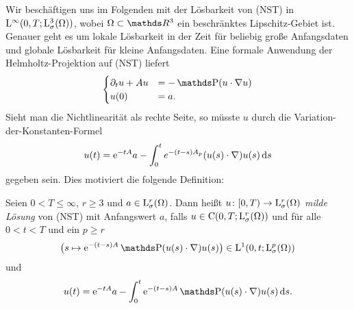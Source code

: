 Wir beschäftigen uns im Folgenden mit der Lösbarkeit von (NST) in $\mathrm{L}^\infty(0,T; \mathrm{L}^3_\sigma(\Omega))$, wobei $\Omega \subset \R^3$ ein beschränktes Lipschitz-Gebiet ist.
Genauer geht es um lokale Lösbarkeit in der Zeit für beliebig große Anfangsdaten und globale Lösbarkeit für kleine Anfangsdaten. Eine formale Anwendung der Helmholtz-Projektion auf (NST) liefert
$$
\begin{cases}
  \partial_t u + Au & = - \PP(u\cdot \nabla u) \\
  u(0) &= a.
\end{cases}
$$
Sieht man die Nichtlinearität als rechte Seite, so müsste $u$ durch die Variation-der-Konstanten-Formel
$$
u(t) = \mathrm{e}^{-tA} a - \int_0^t e^{-(t - s)A_p}(u(s) \cdot \nabla) u(s) \, {\operatorname{d}\!{s}}
$$
gegeben sein. 
Dies motiviert die folgende Definition:
\begin{defn}
  Seien $0 < T \leq \infty$, $r \geq 3$ und $a \in \mathrm{L}_\sigma^r(\Omega)$.
  Dann heißt $u \colon [0,T) \to \mathrm{L}_\sigma^r(\Omega)$ \emph{milde Lösung} von (NST) mit  Anfangswert $a$, falls $u \in \mathrm{C}(0,T; \mathrm{L}_\sigma^r(\Omega))$ und für alle $0 < t< T$ und ein $p \geq r$
  $$
  \big( s \mapsto \e^{-(t - s)A} \PP (u(s) \cdot \nabla) u(s) \big) \in \Ell^1(0,t; \Ell_\sigma^p(\Omega))
  $$
  und
  $$
  u(t) = \e^{-t A} a - \int_0^t \e^{-(t- s) A} \PP(u(s) \cdot \nabla )u(s) \d s.
  $$
\end{defn}

